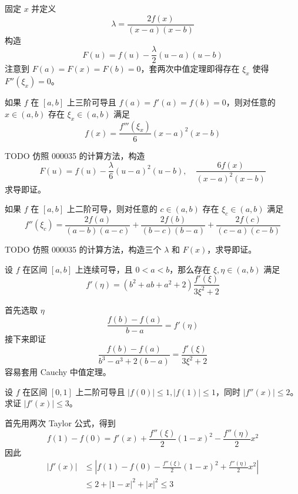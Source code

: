 \begin{solution}
	固定 $x$ 并定义
	\[ \lambda = \frac{2 f(x)}{(x - a)(x - b)} \]
	构造
	\[ F(u) = f(u) - \frac{\lambda}{2} (u - a)(u - b) \]
	注意到 $F(a) = F(x) = F(b) = 0$，套两次中值定理即得存在 $\xi_x$ 使得 $F''(\xi_x) = 0$。
\end{solution}

\begin{problem}[000036]
如果 $f$ 在 $[a, b]$ 上三阶可导且 $f(a) = f'(a) = f(b) = 0$，则对任意的 $x \in (a, b)$ 存在 $\xi_x \in (a, b)$ 满足
\[ f(x) = \frac{f'''(\xi_x)}{6}(x-a)^2(x-b) \]
\end{problem}

\begin{solution}
	TODO 仿照 000035 的计算方法，构造
	\[ F(u) = f(u) - \frac{\lambda}{6}(u - a)^2(u - b), \quad \frac{6f(x)}{(x - a)^2(x - b)} \]
	求导即证。
\end{solution}

\begin{problem}[000037]
如果 $f$ 在 $[a, b]$ 上二阶可导，则对任意的 $c \in (a, b)$ 存在 $\xi_c \in (a, b)$ 满足
\[ f''(\xi_c) = \frac{2 f(a)}{(a - b)(a - c)} + \frac{2 f(b)}{(b - c)(b - a)} + \frac{2f(c)}{(c- a)(c - b)} \]
\end{problem}

\begin{solution}
	TODO 仿照 000035 的计算方法，构造三个 $\lambda$ 和 $F(x)$，求导即证。
\end{solution}

\begin{problem}[000038]
设 $f$ 在区间 $[a, b]$ 上连续可导，且 $0 < a < b$，那么存在 $\xi, \eta \in (a, b)$ 满足
\[ f'(\eta) = (b^2 + ab + a^2 + 2)\frac{f'(\xi)}{3 \xi^2 + 2} \]
\end{problem}

\begin{solution}
	首先选取 $\eta$
	\[ \frac{f(b) - f(a)}{b - a} = f'(\eta) \]
	接下来即证
	\[ \frac{f(b) - f(a)}{b^3 - a^3 + 2(b - a)} = \frac{f'(\xi)}{3\xi^2 + 2} \]
	容易套用 Cauchy 中值定理。
\end{solution}

\begin{problem}[000039]
设 $f$ 在区间 $[0, 1]$ 上二阶可导且 $|f(0)| \leqslant 1, |f(1)| \leqslant 1$，同时 $|f''(x)| \leqslant 2$。求证 $|f'(x)| \leqslant 3$。
\end{problem}

\begin{solution}
	首先用两次 Taylor 公式，得到
	\[ f(1) - f(0) = f'(x) + \frac{f''(\xi)}{2}(1 - x)^2 - \frac{f''(\eta)}{2}x^2 \]
	因此
	\[ \begin{aligned}
			|f'(x)| & \leqslant \left| f(1) - f(0) - \frac{f''(\xi)}{2}(1 - x)^2 + \frac{f''(\eta)}{2}x^2 \right| \\
			        & \leqslant 2 + |1-x|^2 + |x|^2 \leqslant 3
		\end{aligned} \]
\end{solution}

